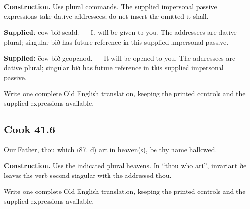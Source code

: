 \textbf{Construction.} Use plural commands. The supplied impersonal passive expressions take dative addressees; do not insert the omitted it shall.

\textbf{Supplied:} ēow bið seald; — It will be given to you. The addressees are dative plural; singular bið has future reference in this supplied impersonal passive.

\textbf{Supplied:} ēow bið geopenod. — It will be opened to you. The addressees are dative plural; singular bið has future reference in this supplied impersonal passive.

Write one complete Old English translation, keeping the printed controls and the supplied expressions available.

\par\begin{minipage}{\linewidth}\raggedright
\subsection*{Cook 41.6}

Our Father, thou which (87. d) art in heaven(s), be thy name hallowed.

\textbf{Construction.} Use the indicated plural heavens. In “thou who art”, invariant ðe leaves the verb second singular with the addressed thou.

Write one complete Old English translation, keeping the printed controls and the supplied expressions available.

\end{minipage}\par\addvspace{4pt}

